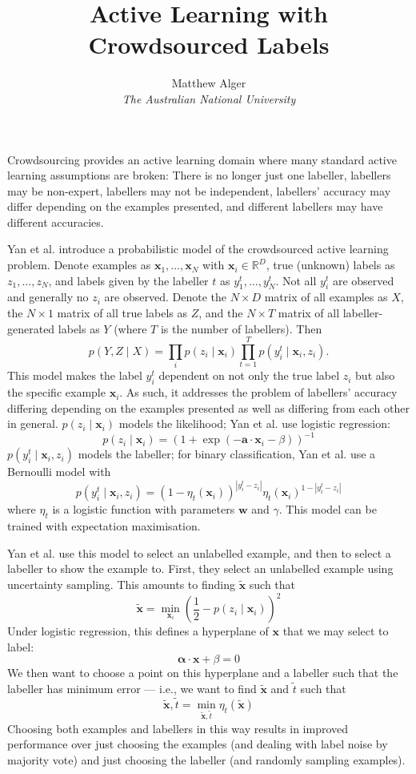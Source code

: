 \documentclass[a4paper]{article}
\renewcommand{\vec}{\boldsymbol}
\newcommand{\vectilde}[1]{\tilde{\boldsymbol{#1}}}
\begin{document}
    \title{Active Learning with Crowdsourced Labels}
    \author{Matthew Alger \\ \emph{The Australian National University}}
    \maketitle

    Crowdsourcing provides an active learning domain where many standard active learning assumptions are broken: There is no longer just one labeller, labellers may be non-expert, labellers may not be independent, labellers' accuracy may differ depending on the examples presented, and different labellers may have different accuracies.

    Yan et al.\cite{yan10} introduce a probabilistic model of the crowdsourced active learning problem. Denote examples as $\vec x_1, \dots, \vec x_N$ with $\vec x_i \in \mathbb{R}^D$, true (unknown) labels as $z_1, \dots, z_N$, and labels given by the labeller $t$ as $y^t_1, \dots, y^t_N$. Not all $y^t_i$ are observed and generally no $z_i$ are observed. Denote the $N \times D$ matrix of all examples as $X$, the $N \times 1$ matrix of all true labels as $Z$, and the $N \times T$ matrix of all labeller-generated labels as $Y$ (where $T$ is the number of labellers). Then
    \[
        p(Y, Z \mid X) = \prod_i p(z_i \mid \vec x_i) \prod_{t = 1}^T p(y^t_i \mid \vec x_i, z_i).
    \]
    This model makes the label $y^t_i$ dependent on not only the true label $z_i$ but also the specific example $\vec x_i$. As such, it addresses the problem of labellers' accuracy differing depending on the examples presented as well as differing from each other in general. $p(z_i \mid \vec x_i)$ models the likelihood; Yan et al. use logistic regression:
    \[
        p(z_i \mid \vec x_i) = (1 + \exp(- \vec a \cdot \vec x_i - \beta))^{-1}
    \]
    $p(y^t_i \mid \vec x_i, z_i)$ models the labeller; for binary classification, Yan et al. use a Bernoulli model with
    \[
        p(y^t_i \mid \vec x_i, z_i) = (1 - \eta_t(\vec x_i))^{|y^t_i - z_i|} \eta_t(\vec x_i)^{1 - |y^t_i - z_i|}
    \]
    where $\eta_t$ is a logistic function with parameters $\vec w$ and $\gamma$. This model can be trained with expectation maximisation.

    Yan et al.\cite{yan11} use this model to select an unlabelled example, and then to select a labeller to show the example to. First, they select an unlabelled example using uncertainty sampling\cite{lewis94}. This amounts to finding $\vectilde x$ such that
    \[
        \vectilde x = \min_{\vec x_i} \left(\frac{1}{2} - p(z_i \mid \vec x_i)\right)^2
    \]
    Under logistic regression, this defines a hyperplane of $\vec x$ that we may select to label:
    \[
        \vec \alpha \cdot \vec x + \beta = 0
    \]
    We then want to choose a point on this hyperplane and a labeller such that the labeller has minimum error --- i.e., we want to find $\vectilde x$ and $\tilde t$ such that
    \[
        \vectilde x, \tilde t = \min_{\vectilde x, \tilde t} \eta_t(\vectilde x)
    \]
    Choosing both examples and labellers in this way results in improved performance over just choosing the examples (and dealing with label noise by majority vote) and just choosing the labeller (and randomly sampling examples).
\end{document}
